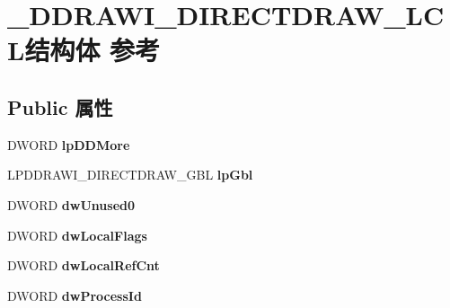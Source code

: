 \hypertarget{struct___d_d_r_a_w_i___d_i_r_e_c_t_d_r_a_w___l_c_l}{}\section{\+\_\+\+D\+D\+R\+A\+W\+I\+\_\+\+D\+I\+R\+E\+C\+T\+D\+R\+A\+W\+\_\+\+L\+C\+L结构体 参考}
\label{struct___d_d_r_a_w_i___d_i_r_e_c_t_d_r_a_w___l_c_l}
\subsection*{Public 属性}
\begin{DoxyCompactItemize}
\item 
\mbox{\label{struct___d_d_r_a_w_i___d_i_r_e_c_t_d_r_a_w___l_c_l_aef1de2920e81bf6995e49223b5bad779}} 
D\+W\+O\+RD {\bfseries lp\+D\+D\+More}
\item 
\mbox{\label{struct___d_d_r_a_w_i___d_i_r_e_c_t_d_r_a_w___l_c_l_a767f54f3ccec3b050a92a16c1a6403a2}} 
L\+P\+D\+D\+R\+A\+W\+I\+\_\+\+D\+I\+R\+E\+C\+T\+D\+R\+A\+W\+\_\+\+G\+BL {\bfseries lp\+Gbl}
\item 
\mbox{\label{struct___d_d_r_a_w_i___d_i_r_e_c_t_d_r_a_w___l_c_l_aa675b8da4a6c41d4904d21a2dd062b45}} 
D\+W\+O\+RD {\bfseries dw\+Unused0}
\item 
\mbox{\label{struct___d_d_r_a_w_i___d_i_r_e_c_t_d_r_a_w___l_c_l_ad92b3a27d4d6fac9f2a459f119e9f411}} 
D\+W\+O\+RD {\bfseries dw\+Local\+Flags}
\item 
\mbox{\label{struct___d_d_r_a_w_i___d_i_r_e_c_t_d_r_a_w___l_c_l_af5e04edc1b0478098a4c45e8905620a3}} 
D\+W\+O\+RD {\bfseries dw\+Local\+Ref\+Cnt}
\item 
\mbox{\label{struct___d_d_r_a_w_i___d_i_r_e_c_t_d_r_a_w___l_c_l_a459f307cd4b27da54d09fc13eb98f762}} 
D\+W\+O\+RD {\bfseries dw\+Process\+Id}
\item 

\end{DoxyCompactItemize}

